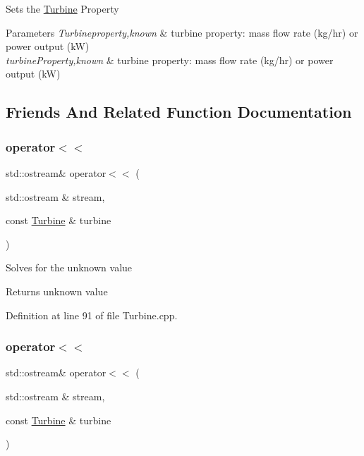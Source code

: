 Sets the \hyperlink{class_turbine}{Turbine} Property


\begin{DoxyParams}{Parameters}
{\em Turbineproperty,known} & turbine property\+: mass flow rate (kg/hr) or power output (kW) \\
\hline
{\em turbine\+Property,known} & turbine property\+: mass flow rate (kg/hr) or power output (kW) \\
\hline
\end{DoxyParams}


\subsection{Friends And Related Function Documentation}
\mbox{\label{class_turbine_a9c58dbc00958ac1b59a59fa3785e86bd}} 
\subsubsection{\texorpdfstring{operator$<$$<$}{operator<<}\hspace{0.1cm}{\footnotesize\ttfamily [1/3]}}
{\footnotesize\ttfamily std\+::ostream\& operator$<$$<$ (\begin{DoxyParamCaption}\item[{std\+::ostream \&}]{stream,  }\item[{const \hyperlink{class_turbine}{Turbine} \&}]{turbine }\end{DoxyParamCaption})\hspace{0.3cm}{\ttfamily [friend]}}

Solves for the unknown value

\begin{DoxyReturn}{Returns}
unknown value 
\end{DoxyReturn}


Definition at line 91 of file Turbine.\+cpp.

\mbox{\label{class_turbine_a9c58dbc00958ac1b59a59fa3785e86bd}} 
\subsubsection{\texorpdfstring{operator$<$$<$}{operator<<}\hspace{0.1cm}{\footnotesize\ttfamily [2/3]}}
{\footnotesize\ttfamily std\+::ostream\& operator$<$$<$ (\begin{DoxyParamCaption}\item[{std\+::ostream \&}]{stream,  }\item[{const \hyperlink{class_turbine}{Turbine} \&}]{turbine }\end{DoxyParamCaption})\hspace{0.3cm}{\ttfamily [friend]}}

